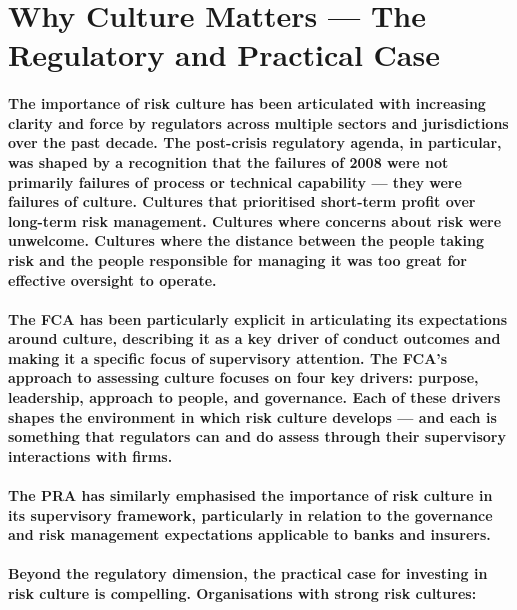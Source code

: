 \section{Why Culture Matters — The Regulatory and Practical Case}
\paragraph{The importance of risk culture has been articulated with increasing clarity and force by regulators across multiple sectors and jurisdictions over the past decade. The post-crisis regulatory agenda, in particular, was shaped by a recognition that the failures of 2008 were not primarily failures of process or technical capability — they were failures of culture. Cultures that prioritised short-term profit over long-term risk management. Cultures where concerns about risk were unwelcome. Cultures where the distance between the people taking risk and the people responsible for managing it was too great for effective oversight to operate.}
\paragraph{The FCA has been particularly explicit in articulating its expectations around culture, describing it as a key driver of conduct outcomes and making it a specific focus of supervisory attention. The FCA's approach to assessing culture focuses on four key drivers: \textbf{purpose, leadership, approach to people}, and \textbf{governance}. Each of these drivers shapes the environment in which risk culture develops — and each is something that regulators can and do assess through their supervisory interactions with firms.}
\paragraph{The PRA has similarly emphasised the importance of risk culture in its supervisory framework, particularly in relation to the governance and risk management expectations applicable to banks and insurers.}
\paragraph{Beyond the regulatory dimension, the practical case for investing in risk culture is compelling. Organisations with strong risk cultures:}
\begin{itemize}
\end{itemize}
